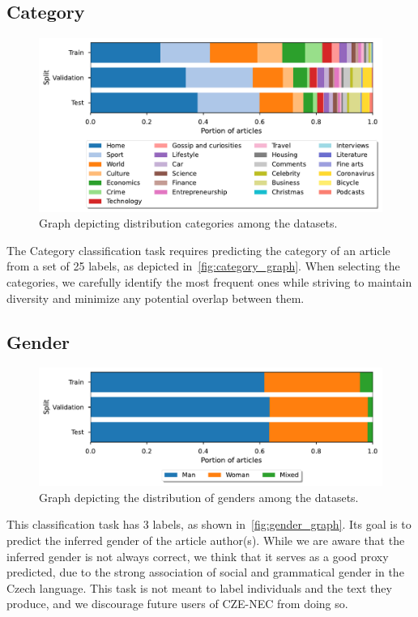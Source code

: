 \subsection{Category}
\begin{figure}[ht]
    \centering
    \includegraphics[width=1.0\textwidth]{img/tasks_graph/category.pdf}
    \caption{Graph depicting distribution categories among the datasets.}
    \label{fig:category_graph}
\end{figure}
The Category classification task requires predicting the category of
an article from a set of 25 labels, as depicted in~\autoref{fig:category_graph}. When selecting the
categories, we carefully identify the most frequent ones while striving to maintain
diversity and minimize any potential overlap between them.

\subsection{Gender}
\begin{figure}[h]
    \centering
    \includegraphics[width=1.0\textwidth]{img/tasks_graph/authors_cum_gender.pdf}
    \caption{Graph depicting the distribution of genders among the datasets.}
    \label{fig:gender_graph}
\end{figure}
This classification task has 3 labels, as shown in~\autoref{fig:gender_graph}.
Its goal is to predict the inferred gender of the article author(s). While we are aware
that the inferred gender is not always correct, we think that it serves as a good proxy predicted, due to the strong
association of social and grammatical gender in the Czech language.
This task is not meant to label individuals and the text they produce, and we discourage future users of CZE-NEC from doing so.

